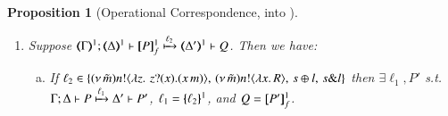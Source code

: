 \documentclass[preprint,11pt]{elsarticle}
\newtheorem{proposition}{Proposition}[section]
\begin{document}
{{\begin{proposition}[Operational Correspondence, \HOp into \HO]
\begin{enumerate}[1.]
\begin{enumerate}[a)]
				\item
					If $\ell_1 = \bactinp{n}{m}$
					and 
					$P' = P_0 \subst{m}{x}$
					then $\exists \ell_2$, $R$ s.t. \\
					$\horel{\tmap{\Gamma}{1}}{\tmap{\Delta}{1}}{\pmapp{P}{1}{f}}{\hby{\ell_2}}{\tmap{\Delta'}{1}}{R}$,
					with $\ell_2 = \mapa{\ell_1}^{1}$, \\
					and
					$\horel{\tmap{\Gamma}{1}}{\tmap{\Delta'}{1}}{R}{\hby{\stau} \hby{\btau} \hby{\btau}}
					{\tmap{\Delta'}{1}}{\pmapp{P_0}{1}{f}\subst{m}{x}}$.
						
				\item
					If $\ell_1 = \tau$
					and $P' \scong \newsp{\tilde{m}}{P_1 \Par P_2\subst{m}{x}}$
					then $\exists R$ s.t. \\
					$\horel{\tmap{\Gamma}{1}}{\tmap{\Delta}{1}}{\pmapp{P}{1}{f}}{\hby{\tau}}{\mapt{\Delta}^{1}}{\newsp{\tilde{m}}{\pmapp{P_1}{1}{f} \Par R}}$,
					and\\ 
					$\horel{\tmap{\Gamma}{1}}{\tmap{\Delta}{1}}{\newsp{\tilde{m}}{\pmapp{P_1}{1}{f} \Par R}}{\hby{\stau} \hby{\btau} \hby{\btau}}
					{\mapt{\Delta}^{1}}{\newsp{\tilde{m}}{\pmapp{P_1}{1}{f} \Par \pmapp{P_2}{1}{f}\subst{m}{x}}}$.
			
				\item
					If $\ell_1 = \tau$
					and $P' \scong \newsp{\tilde{m}}{P_1 \Par P_2 \subst{\abs{y}Q}{x}}$
					then \\
					$\horel{\tmap{\Gamma}{1}}{\tmap{\Delta}{1}}{\pmapp{P}{1}{f}}{\hby{\tau}}
					{\tmap{\Delta_1}{1}}{\newsp{\tilde{m}}{\pmapp{P_1}{1}{f}\Par \pmapp{P_2}{1}{f}\subst{\abs{y}\pmapp{Q}{1}{\emptyset}}{x}}}$.
			
				\item
					If $\ell_1 = \tau$
					and $P' \not\scong \newsp{\tilde{m}}{P_1 \Par P_2 \subst{m}{x}} \land P' \not\scong \newsp{\tilde{m}}{P_1 \Par P_2\subst{\abs{y}Q}{x}}$
					then \\
					$\horel{\tmap{\Gamma}{1}}{\tmap{\Delta}{1}}{\pmapp{P}{1}{f}}{\hby{\tau}}{\tmap{\Delta'_1}{1}}{ \pmapp{P'}{1}{f}}$.
			\end{enumerate}
			
		\item	Suppose $\horel{\tmap{\Gamma}{1}}{\tmap{\Delta}{1}}{\pmapp{P}{1}{f}}{\hby{\ell_2}}{\tmap{\Delta'}{1}}{Q}$.
			Then we have:
%
			\begin{enumerate}[a)]
				\item 
					If $\ell_2 \in
					\{(\nu\, \tilde{m})n ! \langle \lambda z.\,\,z ? (x) . (x\, {m}) \rangle, \,(\nu\, \tilde{m}) n ! \langle \lambda x.\,R \rangle, \,s \oplus l, \,s \& l\}$
					then $\exists \ell_1, P'$ s.t. \\
					$\Gamma; \Delta \vdash P \xmapsto{\ell_1} \Delta' \vdash P'$, 
					$\ell_1 = \{\!\!\{\ell_2\}\!\!\}^{1}$, 
					and
					$Q = [\!\![P']\!\!]^1_f$.
			

\end{enumerate}
\end{enumerate}
\end{proposition}}}
\end{document}

